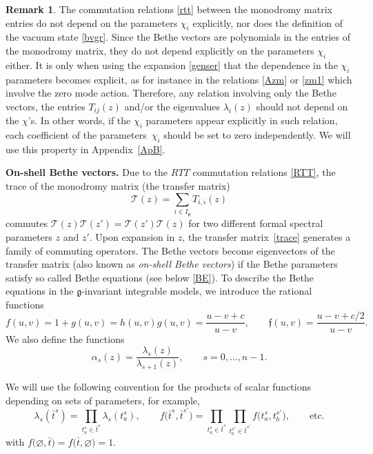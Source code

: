 \documentclass[pdftex]{sigma}
\newcommand{\bt}{{\bar t}}
\theoremstyle{definition}
\newtheorem{rem}[thm]{Remark}
\def\r#1{\eqref{#1}}
\def\fgo{\mathfrak{f}}
\def\Ig{I_{\mathfrak{g}}}
\begin{document}
\begin{rem}\label{rem: chi homogeneity}
The commutation relations \eqref{rtt} between the monodromy matrix entries do not depend on the parameters $\chi_{i}$ explicitly, nor does the definition of the vacuum state \eqref{bvgr}. Since the Bethe vectors are polynomials in the entries of the monodromy matrix, they do not depend explicitly on the parameters $\chi_{i}$ either.
It is only when using the expansion \eqref{genser} that the dependence in the $\chi_i$ parameters becomes explicit, as for instance in the relations \eqref{Azm} or \eqref{zm1} which involve the zero mode action. Therefore, any relation involving only the Bethe vectors, the entries $T_{ij}(z)$ and/or the eigenvalues $\lambda_i(z)$ should not depend on the $\chi$'s. In other words, if the $\chi_i$ parameters appear explicitly in such relation, each coefficient of the parameters~$\chi_i$ should be set to zero independently. We will use this property in Appendix~\ref{ApB}.
\end{rem}

{\bf On-shell Bethe vectors.}
Due to the $RTT$ commutation relations \r{RTT}, the trace
of the monodromy matrix (the transfer matrix)
\begin{equation}\label{trace}
\mathcal{T}(z)=\sum_{i\in\Ig}T_{i,i}(z)
\end{equation}
commutes
$
\mathcal{T}(z) \mathcal{T}(z')=\mathcal{T}(z') \mathcal{T}(z)
$
for two different formal spectral parameters $z$ and $z'$. Upon expansion in $z$, the transfer matrix~\eqref{trace} generates a family of commuting operators.
The Bethe vectors become eigenvectors of the transfer matrix (also known as {\it on-shell Bethe vectors}) if the Bethe
parameters satisfy so called Bethe equations (see below \r{BE}).
To describe the Bethe equations in the $\mathfrak{g}$-invariant integrable models,
we introduce the rational functions
\[%
f(u,v)=1+g(u,v)=h(u,v)g(u,v)=\frac{u-v+c}{u-v},\qquad \fgo(u,v)=\frac{u-v+c/2}{u-v} .
\]
 We also define the functions
\[%
 \alpha_s(z) = \frac{\lambda_s(z)}{\lambda_{s+1}(z)}, \qquad s = 0, \dots, n-1.
\]

We will use the following convention for the products of scalar
functions depending on sets of parameters, for example,
\begin{equation}\label{eq:convention}
\lambda_s(\bt^s)=\prod_{t^s_a \in \bt^s}\lambda_s(t^s_a),\qquad
f\bigl(\bt^s,\bt^{s'}\bigr)=\prod_{t^s_a \in \bt^s}
\prod_{t^{s'}_b \in \bt^{s'}}f\bigl(t^s_a, t^{s'}_b\bigr),\qquad \mbox{etc.}
\end{equation}
with $f\bigl(\varnothing,\bt\bigr)=f\bigl(\bt,\varnothing\bigr)=1$.
\end{document}
